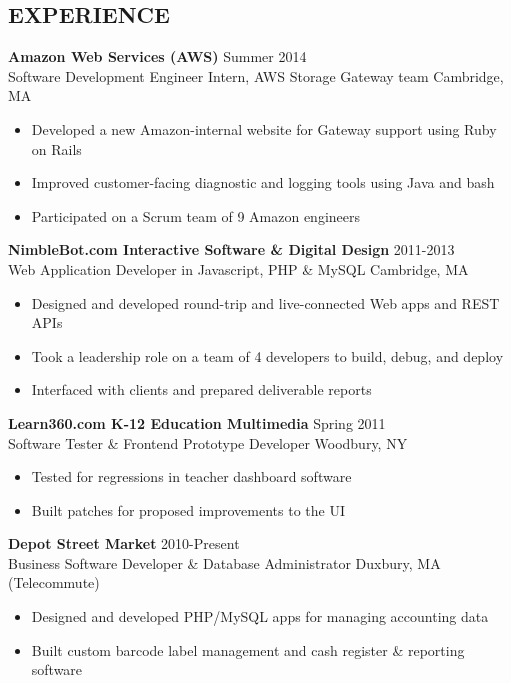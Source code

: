 \documentclass[line,margin]{res}
\begin{document}
\begin{resume}
\section{EXPERIENCE}
    {\large \textbf{Amazon Web Services (AWS)}}
    \hfill Summer 2014 \\
    Software Development Engineer Intern, AWS Storage Gateway team
    \hfill Cambridge, MA
    \begin{itemize}  \itemsep -2pt
        \item Developed a new Amazon-internal website for Gateway support using Ruby on Rails
        \item Improved customer-facing diagnostic and logging tools using Java and bash
        \item Participated on a Scrum team of 9 Amazon engineers
    \end{itemize}
    
    {\large \textbf{NimbleBot.com Interactive Software \& Digital Design}}
    \hfill 2011-2013 \\
    Web Application Developer in Javascript, PHP \& MySQL
    \hfill Cambridge, MA
    \begin{itemize}  \itemsep -2pt %
        \item Designed and developed round-trip and live-connected Web apps and REST APIs
        \item Took a leadership role on a team of 4 developers to build, debug, and deploy
        \item Interfaced with clients and prepared deliverable reports
    \end{itemize}

    {\large \textbf{Learn360.com K-12 Education Multimedia}}
    \hfill Spring 2011 \\
    Software Tester \& Frontend Prototype Developer
    \hfill Woodbury, NY
    \begin{itemize}  \itemsep -2pt %
        \item Tested for regressions in teacher dashboard software
        \item Built patches for proposed improvements to the UI
    \end{itemize}

    {\large \textbf{Depot Street Market}}
    \hfill 2010-Present \\
    Business Software Developer \& Database Administrator
    \hfill Duxbury, MA {\footnotesize (Telecommute)}
    \begin{itemize}  \itemsep -2pt %
        \item Designed and developed PHP/MySQL apps for managing accounting data
        \item Built custom barcode label management and cash register \& reporting software
    \end{itemize}


\end{resume}
\end{document}

